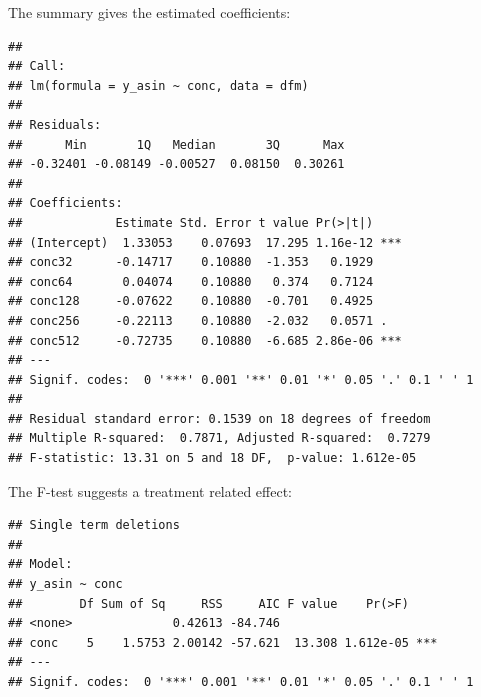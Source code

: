 The summary gives the estimated coefficients:
\begin{knitrout}
\color{fgcolor}\small\begin{kframe}
\begin{alltt}
\end{alltt}
\begin{verbatim}
## 
## Call:
## lm(formula = y_asin ~ conc, data = dfm)
## 
## Residuals:
##      Min       1Q   Median       3Q      Max 
## -0.32401 -0.08149 -0.00527  0.08150  0.30261 
## 
## Coefficients:
##             Estimate Std. Error t value Pr(>|t|)    
## (Intercept)  1.33053    0.07693  17.295 1.16e-12 ***
## conc32      -0.14717    0.10880  -1.353   0.1929    
## conc64       0.04074    0.10880   0.374   0.7124    
## conc128     -0.07622    0.10880  -0.701   0.4925    
## conc256     -0.22113    0.10880  -2.032   0.0571 .  
## conc512     -0.72735    0.10880  -6.685 2.86e-06 ***
## ---
## Signif. codes:  0 '***' 0.001 '**' 0.01 '*' 0.05 '.' 0.1 ' ' 1
## 
## Residual standard error: 0.1539 on 18 degrees of freedom
## Multiple R-squared:  0.7871,	Adjusted R-squared:  0.7279 
## F-statistic: 13.31 on 5 and 18 DF,  p-value: 1.612e-05
\end{verbatim}
\end{kframe}
\end{knitrout}

The F-test suggests a treatment related effect:
\begin{knitrout}
\color{fgcolor}\small\begin{kframe}
\begin{alltt}
  \hlstd{=} \hlstd{)}
\end{alltt}
\begin{verbatim}
## Single term deletions
## 
## Model:
## y_asin ~ conc
##        Df Sum of Sq     RSS     AIC F value    Pr(>F)    
## <none>              0.42613 -84.746                      
## conc    5    1.5753 2.00142 -57.621  13.308 1.612e-05 ***
## ---
## Signif. codes:  0 '***' 0.001 '**' 0.01 '*' 0.05 '.' 0.1 ' ' 1
\end{verbatim}
\end{kframe}
\end{knitrout}

